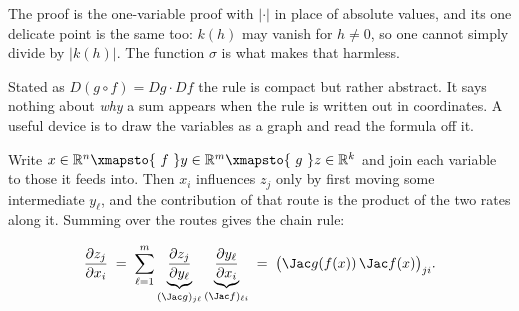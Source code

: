 The proof is the one-variable proof with $\lvert\cdot\rvert$ in place of absolute values, and its
one delicate point is the same too: $k(h)$ may vanish for $h \neq 0$, so one cannot simply divide
by $\lvert k(h)\rvert$. The function $\sigma$ is what makes that harmless.

\begin{remark}
\label{rem:chain_rule_paths}
Stated as $D(g\circ f) = Dg\cdot Df$ the rule is compact but rather abstract. It says nothing
about \emph{why} a sum appears when the rule is written out in coordinates. A useful device is to
draw the variables as a graph and read the formula off it.

Write $x \in \mathbb{R}^n \xmapsto{\ f\ } y \in \mathbb{R}^m \xmapsto{\ g\ } z \in \mathbb{R}^k$
and join each variable to those it feeds into. Then $x_i$ influences $z_j$ only by first moving
some intermediate $y_\ell$, and the contribution of that route is the product of the two rates
along it. Summing over the routes gives the chain rule:

\begin{center}
\end{center}

\[\frac{\partial z_j}{\partial x_i}
  \;=\; \sum_{\ell=1}^{m}
  \underbrace{\frac{\partial z_j}{\partial y_\ell}}_{(\Jac g)_{j\ell}}
  \underbrace{\frac{\partial y_\ell}{\partial x_i}}_{(\Jac f)_{\ell i}}
  \;=\; \big(\Jac g(f(x))\,\Jac f(x)\big)_{ji}.\]


\end{remark}
